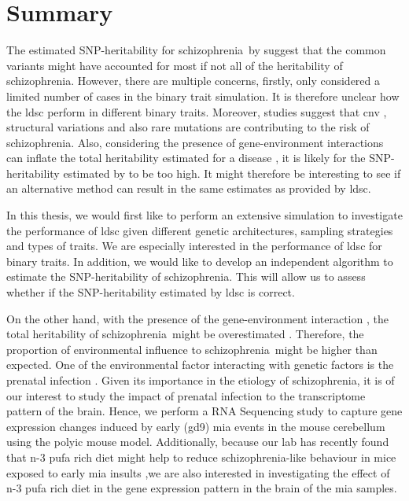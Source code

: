 \documentclass[12pt]{scrbook}
\newcommand*{\scz}{schizophrenia}
\begin{document}
\section{Summary}
The estimated \gls{SNP}-heritability for \scz\ by \citet{Bulik-Sullivan2015} suggest that the common variants might have accounted for most if not all of the heritability of \scz.
However, there are multiple concerns, firstly, \citet{Bulik-Sullivan2015} only considered a limited number of cases in the binary trait simulation. 
It is therefore unclear how the \gls{ldsc} perform in different binary traits.
Moreover, studies suggest that \gls{cnv} \citep{Szatkiewicz2014}, structural variations \citep{Walsh2008} and also rare mutations \citep{purcell2014polygenic} are contributing to the risk of \scz.
Also, considering the presence of gene-environment interactions can inflate the total heritability estimated for a disease \citet{zuk2012mystery}, it is likely for the \gls{SNP}-heritability estimated by \citet{Bulik-Sullivan2015} to be too high.
It might therefore be interesting to see if an alternative method can result in the same estimates  as provided by \gls{ldsc}.

In this thesis, we would first like to perform an extensive simulation to investigate the performance of \gls{ldsc} given different genetic architectures, sampling strategies and types of traits. 
We are especially interested in the performance of \gls{ldsc} for binary traits. 
In addition, we would like to develop an independent algorithm to estimate the \gls{SNP}-heritability of \scz.
This will allow us to assess whether if the \gls{SNP}-heritability estimated by \gls{ldsc} is correct.

On the other hand, with the presence of the gene-environment interaction \citep{Tienari2004,Clarke2009}, the total heritability of \scz\ might be overestimated \citet{zuk2012mystery}.
Therefore, the proportion of environmental influence to \scz\ might be higher than expected.
One of the environmental factor interacting with genetic factors is the prenatal infection \citet{Clarke2009}.
Given its importance in the etiology of \scz, it is of our interest to study the impact of prenatal infection to the transcriptome pattern of the brain.
Hence, we perform a RNA Sequencing study to capture gene expression changes induced by early (\gls{gd}9) \gls{mia} events in the mouse cerebellum using the \gls{polyic} mouse model.
Additionally, because our lab has recently found that n-3 \gls{pufa} rich diet might help to reduce \scz-like behaviour in mice exposed to early \gls{mia} insults \citep{Li2015},we are also interested in investigating the effect of n-3 \gls{pufa} rich diet in the gene expression pattern in the brain of the \gls{mia} samples. 
\end{document}
